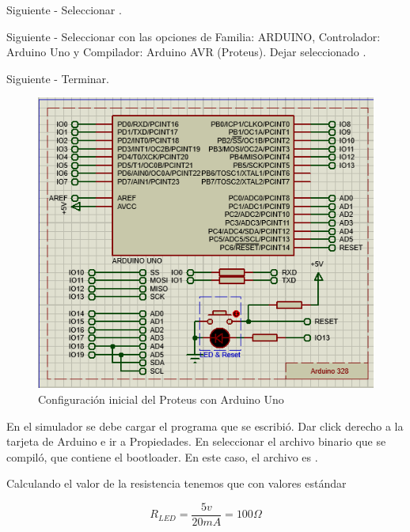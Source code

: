 \documentclass{article}
\begin{document}
    \bigbreak

    Siguiente - Seleccionar .

    \bigbreak

    Siguiente - Seleccionar  con las opciones
    de Familia: ARDUINO, Controlador:
    Arduino Uno y Compilador: Arduino AVR (Proteus). Dejar seleccionado
    .

    \bigbreak

    Siguiente - Terminar.

    \begin{figure}[H]
        \centering
        \includegraphics[width=0.5\paperwidth]{images/sim-1}
        \caption{Configuración inicial del Proteus con Arduino Uno}\label{fig:figure4}
    \end{figure}

    En el simulador se debe cargar el programa que se escribió. Dar click
    derecho a la tarjeta de Arduino e ir a
    Propiedades. En  seleccionar el archivo binario
    que se compiló, que contiene el bootloader.
    En este caso, el archivo es .

    \bigbreak

    Calculando el valor de la resistencia tenemos que con valores estándar

    \[
        R_{LED} = \frac{5v}{20mA} = 100\Omega
    \]
\end{document}
